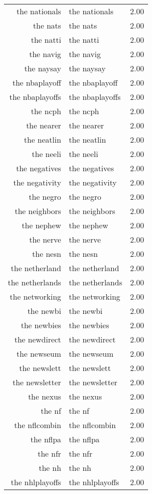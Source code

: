 \begin{table}[ht]
\begin{tabular}{rlr}
  the nationals & the nationals & 2.00 \\ 
  the nats & the nats & 2.00 \\ 
  the natti & the natti & 2.00 \\ 
  the navig & the navig & 2.00 \\ 
  the naysay & the naysay & 2.00 \\ 
  the nbaplayoff & the nbaplayoff & 2.00 \\ 
  the nbaplayoffs & the nbaplayoffs & 2.00 \\ 
  the ncph & the ncph & 2.00 \\ 
  the nearer & the nearer & 2.00 \\ 
  the neatlin & the neatlin & 2.00 \\ 
  the neeli & the neeli & 2.00 \\ 
  the negatives & the negatives & 2.00 \\ 
  the negativity & the negativity & 2.00 \\ 
  the negro & the negro & 2.00 \\ 
  the neighbors & the neighbors & 2.00 \\ 
  the nephew & the nephew & 2.00 \\ 
  the nerve & the nerve & 2.00 \\ 
  the nesn & the nesn & 2.00 \\ 
  the netherland & the netherland & 2.00 \\ 
  the netherlands & the netherlands & 2.00 \\ 
  the networking & the networking & 2.00 \\ 
  the newbi & the newbi & 2.00 \\ 
  the newbies & the newbies & 2.00 \\ 
  the newdirect & the newdirect & 2.00 \\ 
  the newseum & the newseum & 2.00 \\ 
  the newslett & the newslett & 2.00 \\ 
  the newsletter & the newsletter & 2.00 \\ 
  the nexus & the nexus & 2.00 \\ 
  the nf & the nf & 2.00 \\ 
  the nflcombin & the nflcombin & 2.00 \\ 
  the nflpa & the nflpa & 2.00 \\ 
  the nfr & the nfr & 2.00 \\ 
  the nh & the nh & 2.00 \\ 
  the nhlplayoffs & the nhlplayoffs & 2.00 \\ 

\end{tabular}
\end{table}

